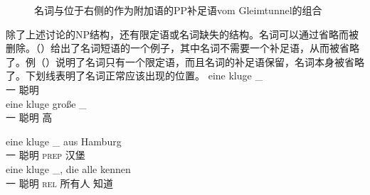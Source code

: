 \begin{figure}
\caption{\label{Abbildung-NP-mit-PP-Argument}名词与位于右侧的作为附加语的PP补足语vom Gleimtunnel的组合}
\end{figure}%

除了上述讨论的NP结构，还有限定语或名词缺失的结构。名词可以通过省略而被删除。（）给出了名词短语的一个例子，其中名词不需要一个补足语，从而被省略了。例（）说明了名词只有一个限定语，而且名词的补足语保留，名词本身被省略了。下划线表明了名词正常应该出现的位置。
\eal
\label{ex-nounless-np}
\ex 
\gll eine kluge \_\\
	 一 聪明\\
\ex 
\gll eine kluge große \_\\
     一    聪明 高\\

\ex 
\gll eine kluge \_ aus Hamburg\\
	 一 聪明 {} \textsc{prep} 汉堡\\
\ex 
\gll eine kluge \_, die alle kennen\\
	 一 聪明 {} \textsc{rel} 所有人 知道\\
\zl

